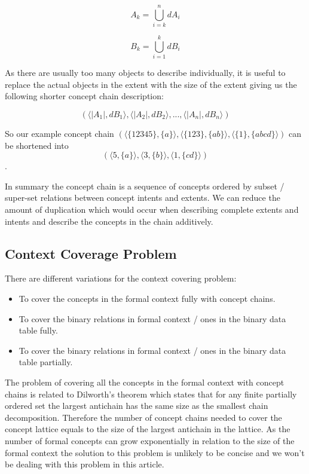 \documentclass[acmconf,authordraft]{acmart}
\begin{document}
\begin{equation}
A_k = \bigcup_{i=k}^{n} dA_i
\end{equation}

\begin{equation}
B_k = \bigcup_{i=1}^{k} dB_i
\end{equation}

As there are usually too many objects to describe  individually, it is useful to replace the actual objects in the extent with the size of the extent giving us the following shorter concept chain description:

\begin{displaymath}
 (\langle|A_1|, dB_1 \rangle,\langle |A_2|, dB_2 \rangle,  ..., \langle |A_n|, dB_n \rangle)
\end{displaymath}

So our example concept chain 
$(\langle \{12345\}, \{a\} \rangle,
 \langle \{123\}, \{ab\} \rangle,  \langle \{1\}, \{abcd\} \rangle)$
 can be shortened into
 \begin{displaymath}
 (\langle 5, \{a\} \rangle,
 \langle 3, \{b\} \rangle,  
 \langle 1, \{cd\} \rangle)
 \end{displaymath}.

In summary the concept chain is a sequence of concepts ordered by subset / super-set relations between concept intents and extents. We can reduce the amount of duplication which would occur when describing complete extents and intents and describe the concepts in the chain additively.

\subsection{Context Coverage Problem}

There are different variations for the context covering problem:

\begin{itemize}
  \item To cover the concepts in the formal context fully with concept chains.
  \item To cover the binary relations in formal context / ones in the binary data table fully.
  \item To cover the binary relations in formal context / ones in the binary data table partially.
\end{itemize}

The problem of covering all the concepts in the formal context with concept chains is related to Dilworth's theorem \cite{dilworth_decomposition_1950} which states that for any finite partially ordered set the largest antichain has the same size as the smallest chain decomposition. Therefore the number of concept chains needed to cover the concept lattice equals to the size of the largest antichain in the lattice. As the number of formal concepts can grow exponentially in relation to the size of the formal context the solution to this problem is unlikely to be concise and we won't be dealing with this problem in this article.
\end{document}
